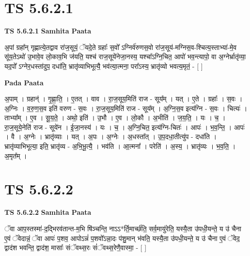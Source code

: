\documentclass[17pt]{extarticle}
\begin{document}

\section{ TS 5.6.2.1 }

\textbf{TS 5.6.2.1 } \newline
\textbf{Samhita Paata} \newline

अ॒पां ग्रहा᳚न् गृह्णात्ये॒तद्वाव रा॑ज॒सूयं॒ ॅयदे॒ते ग्रहाः᳚ स॒वो᳚ ऽग्निर्व॑रुणस॒वो रा॑ज॒सूय॑-मग्निस॒व-श्चित्य॒स्ताभ्या॑-मे॒व सू॑य॒तेऽथो॑ उ॒भावे॒व लो॒काव॒भि ज॑यति॒ यश्च॑ राज॒सूये॑नेजा॒नस्य॒ यश्चा᳚ऽग्नि॒चित॒ आपो॑ भव॒न्त्यापो॒ वा अ॒ग्नेर्भ्रातृ॑व्या॒ यद॒पो᳚ ऽग्नेर॒धस्ता॑दुप॒ दधा॑ति॒ भ्रातृ॑व्याभिभूत्यै॒ भव॑त्या॒त्मना॒ परा᳚ऽस्य॒ भ्रातृ॑व्यो भवत्य॒मृतं॒ - [  ] \newline

\textbf{Pada Paata} \newline

अ॒पाम् । ग्रहान्॑ । गृ॒ह्णा॒ति॒ । ए॒तत् । वाव । रा॒ज॒सूय॒मिति॑ राज - सूय᳚म् । यत् । ए॒ते । ग्रहाः᳚ । स॒वः । अ॒ग्निः । व॒रु॒ण॒स॒व इति॑ वरुण - स॒वः । रा॒ज॒सूय॒मिति॑ राज - सूय᳚म् । अ॒ग्नि॒स॒व इत्य॑ग्नि - स॒वः । चित्यः॑ । ताभ्या᳚म् । ए॒व । सू॒य॒ते॒ । अथो॒ इति॑ । उ॒भौ । ए॒व । लो॒कौ । अ॒भीति॑ । ज॒य॒ति॒ । यः । च॒ । रा॒ज॒सूये॒नेति॑ राज - सूये॑न । ई॒जा॒नस्य॑ । यः । च॒ । अ॒ग्नि॒चित॒ इत्य॑ग्नि-चितः॑ । आपः॑ । भ॒व॒न्ति॒ । आपः॑ । वै । अ॒ग्नेः । भ्रातृ॑व्याः । यत् । अ॒पः । अ॒ग्नेः । अ॒धस्ता᳚त् । उ॒प॒दधा॒तीत्यु॑प - दधा॑ति । भ्रातृ॑व्याभिभूत्या॒ इति॒ भ्रातृ॑व्य - अ॒भि॒भू॒त्यै॒ । भव॑ति । आ॒त्मना᳚ । परेति॑ । अ॒स्य॒ । भ्रातृ॑व्यः । भ॒व॒ति॒ । अ॒मृत᳚म् ।  \newline





\section{ TS 5.6.2.2 }

\textbf{TS 5.6.2.2 } \newline
\textbf{Samhita Paata} \newline

ॅवा आप॒स्तस्मा॑-द॒द्भिरव॑तान्त-म॒भि षि॑ञ्चन्ति॒ नाऽऽ*र्ति॒मार्च्छ॑ति॒ सर्व॒मायु॑रेति॒ यस्यै॒ता उ॑पधी॒यन्ते॒ य उ॑ चैना ए॒वं ॅवेदान्नं॒ ॅवा आपः॑ प॒शव॒ आपोऽन्नं॑ प॒शवो᳚ऽन्ना॒दः प॑शु॒मान् भ॑वति॒ यस्यै॒ता उ॑पधी॒यन्ते॒ य उ॑ चैना ए॒वं ॅवेद॒ द्वाद॑श भवन्ति॒ द्वाद॑श॒ मासाः᳚ संॅवथ्स॒रः सं॑ॅवथ्स॒रेणै॒वास्मा॒ - [  ] \newline
\end{document}
